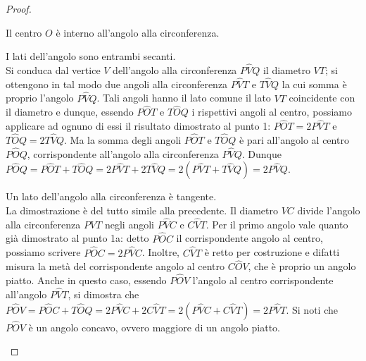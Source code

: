 \begin{proof}
\begin{enumerate*}
\item Il centro \(O\) è interno all'angolo alla circonferenza.
\begin{enumerate*}
\noindent\begin{minipage}{0.6\textwidth}\parindent15pt
\item I lati dell'angolo sono entrambi secanti.\\
Si conduca dal vertice \(V\) dell'angolo alla circonferenza 
\(P\widehat{V}Q\) il diametro \(VT\); si ottengono in tal modo due angoli 
alla circonferenza \(P\widehat{V}T\) e \(T\widehat{V}Q\) la cui somma è 
proprio l'angolo \(P\widehat{V}Q\). Tali angoli hanno il lato comune il 
lato \(VT\) coincidente con il diametro e dunque, essendo 
\(P\widehat{O}T\) e \(T\widehat{O}Q\) i rispettivi angoli al centro, 
possiamo applicare ad ognuno di essi il risultato dimostrato al punto 
1: \(P\widehat{O}T=2P\widehat{V}T\) e \(T\widehat{O}Q=2T\widehat{V}Q\).
Ma la somma degli angoli \(P\widehat{O}T\) e \(T\widehat{O}Q\) è pari 
all'angolo al centro \(P\widehat{O}Q\), corrispondente all'angolo alla 
circonferenza \(P\widehat{V}Q\).
Dunque 
\(P\widehat{O}Q=P\widehat{O}T+T\widehat{O}Q=2P\widehat{V}T+2T\widehat{V
} Q=2(P\widehat{V}T+T\widehat{V}Q)=2P\widehat{V}Q\).
\end{minipage}\hfil
\noindent\hspace{-20pt}\begin{minipage}{0.4\textwidth}
  \centering
\end{minipage}
\noindent\begin{minipage}{0.6\textwidth}\parindent15pt
\item Un lato dell'angolo alla circonferenza è tangente.\\
La dimostrazione è del tutto simile alla precedente. Il diametro \(VC\) 
divide l'angolo alla circonferenza \(P\widehat{V}T\) negli angoli 
\(P\widehat{V}C\) e \(C\widehat{V}T\). Per il primo angolo vale quanto 
già dimostrato al punto 1a: detto 
\(P\widehat{O}C\) il corrispondente angolo al centro, possiamo scrivere 
\(P\widehat{O}C=2P\widehat{V}C\). Inoltre, \(C\widehat{V}T\) è retto per 
costruzione e difatti misura la metà del corrispondente angolo al 
centro \(C\widehat{O}V\), che è proprio un angolo piatto. 
Anche in questo caso, essendo 
\(P\widehat{O}V\) l'angolo al centro corrispondente all'angolo 
\(P\widehat{V}T\), si dimostra che 
\(P\widehat{O}V=P\widehat{O}C+T\widehat{O}Q=2P\widehat{V}C+2C\widehat{V
} T=2(P\widehat{V}C+C\widehat{V}T)=2P\widehat{V}T\).
Si noti che \(P\widehat{O}V\) è un angolo concavo, ovvero maggiore di 
un angolo piatto.
\end{minipage}\hfil
\noindent\hspace{-20pt}\begin{minipage}{0.4\textwidth}
  \centering
\end{minipage}
\end{enumerate*}


\end{enumerate*}
\end{proof}
